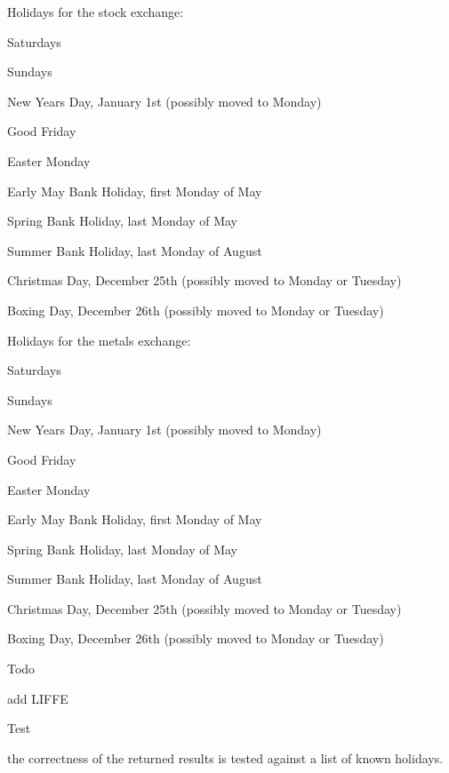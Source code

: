 Holidays for the stock exchange\+: 
\begin{DoxyItemize}
\item Saturdays 
\item Sundays 
\item New Year\textquotesingle{}s Day, January 1st (possibly moved to Monday) 
\item Good Friday 
\item Easter Monday 
\item Early May Bank Holiday, first Monday of May 
\item Spring Bank Holiday, last Monday of May 
\item Summer Bank Holiday, last Monday of August 
\item Christmas Day, December 25th (possibly moved to Monday or Tuesday) 
\item Boxing Day, December 26th (possibly moved to Monday or Tuesday) 
\end{DoxyItemize}

Holidays for the metals exchange\+: 
\begin{DoxyItemize}
\item Saturdays 
\item Sundays 
\item New Year\textquotesingle{}s Day, January 1st (possibly moved to Monday) 
\item Good Friday 
\item Easter Monday 
\item Early May Bank Holiday, first Monday of May 
\item Spring Bank Holiday, last Monday of May 
\item Summer Bank Holiday, last Monday of August 
\item Christmas Day, December 25th (possibly moved to Monday or Tuesday) 
\item Boxing Day, December 26th (possibly moved to Monday or Tuesday) 
\end{DoxyItemize}

\begin{DoxyRefDesc}{Todo}
\item[{\bf Todo}]add L\+I\+F\+FE\end{DoxyRefDesc}


\begin{DoxyRefDesc}{Test}
\item[{\bf Test}]the correctness of the returned results is tested against a list of known holidays. \end{DoxyRefDesc}


